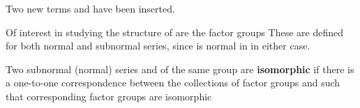 \documentclass[11pt,oneside]{article}
\begin{document}
\begin{BookBody}
\noindent Two new terms and  have been inserted. \BookEnd{\blacktriangle}

Of interest in studying the structure of  are the factor groups  These are defined for both normal and subnormal series, since  is normal in  in either case.

 Two subnormal (normal) series  and  of the same group  are\textbf{ isomorphic} if there is a one-to-one correspondence between the collections of factor groups  and  such that corresponding factor groups are isomorphic\BookEnd{\blacksquare}

\end{BookBody}

\BookNarrativetrue
\end{document}
